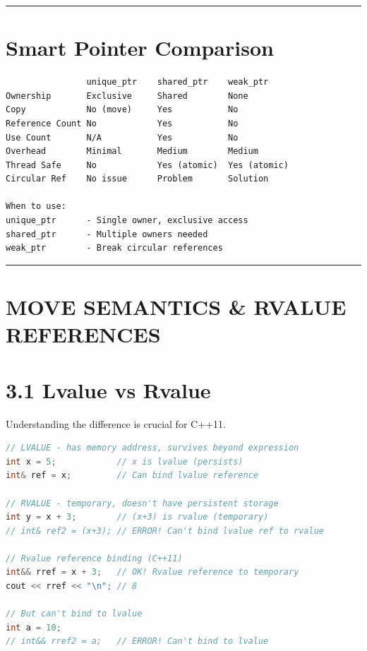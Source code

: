 \begin{center}\rule{0.5\linewidth}{0.5pt}\end{center}

\hypertarget{smart-pointer-comparison}{%
\section{Smart Pointer Comparison}\label{smart-pointer-comparison}}

\begin{lstlisting}
                unique_ptr    shared_ptr    weak_ptr
Ownership       Exclusive     Shared        None
Copy            No (move)     Yes           No
Reference Count No            Yes           No
Use Count       N/A           Yes           No
Overhead        Minimal       Medium        Medium
Thread Safe     No            Yes (atomic)  Yes (atomic)
Circular Ref    No issue      Problem       Solution

When to use:
unique_ptr      - Single owner, exclusive access
shared_ptr      - Multiple owners needed
weak_ptr        - Break circular references
\end{lstlisting}

\begin{center}\rule{0.5\linewidth}{0.5pt}\end{center}

\hypertarget{move-semantics-rvalue-references}{%
\section{MOVE SEMANTICS \& RVALUE
REFERENCES}\label{move-semantics-rvalue-references}}

\hypertarget{lvalue-vs-rvalue}{%
\section{3.1 Lvalue vs Rvalue}\label{lvalue-vs-rvalue}}

Understanding the difference is crucial for C++11.

\begin{lstlisting}[language={C++}]
// LVALUE - has memory address, survives beyond expression
int x = 5;            // x is lvalue (persists)
int& ref = x;         // Can bind lvalue reference

// RVALUE - temporary, doesn't have persistent storage
int y = x + 3;        // (x+3) is rvalue (temporary)
// int& ref2 = (x+3); // ERROR! Can't bind lvalue ref to rvalue

// Rvalue reference binding (C++11)
int&& rref = x + 3;   // OK! Rvalue reference to temporary
cout << rref << "\n"; // 8

// But can't bind to lvalue
int a = 10;
// int&& rref2 = a;   // ERROR! Can't bind to lvalue
\end{lstlisting}

